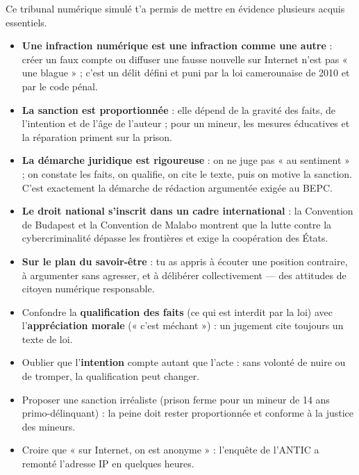 \documentclass[11pt]{article}
\newcounter{popsec}
\newcounter{popsub}
\newcommand{\courssub}[1]{%
  \stepcounter{popsub}%
  \par\vspace{9pt}\noindent{\popxbold\fontsize{11.5}{13}\selectfont\color{popink}{\color{poporange}\thepopsec.\thepopsub}\hspace{6pt}#1}\par\nopagebreak\vspace{4pt}
}
\begin{document}
\courssub{Bilan de l'activité}

Ce tribunal numérique simulé t'a permis de mettre en évidence plusieurs acquis essentiels.

\begin{itemize}
\item \textbf{Une infraction numérique est une infraction comme une autre} : créer un faux compte ou diffuser une fausse nouvelle sur Internet n'est pas « une blague » ; c'est un délit défini et puni par la loi camerounaise de 2010 et par le code pénal.
\item \textbf{La sanction est proportionnée} : elle dépend de la gravité des faits, de l'intention et de l'âge de l'auteur ; pour un mineur, les mesures éducatives et la réparation priment sur la prison.
\item \textbf{La démarche juridique est rigoureuse} : on ne juge pas « au sentiment » ; on constate les faits, on qualifie, on cite le texte, puis on motive la sanction. C'est exactement la démarche de rédaction argumentée exigée au BEPC.
\item \textbf{Le droit national s'inscrit dans un cadre international} : la Convention de Budapest et la Convention de Malabo montrent que la lutte contre la cybercriminalité dépasse les frontières et exige la coopération des États.
\item \textbf{Sur le plan du savoir-être} : tu as appris à écouter une position contraire, à argumenter sans agresser, et à délibérer collectivement — des attitudes de citoyen numérique responsable.
\end{itemize}

\begin{attention}
\begin{itemize}
\item Confondre la \textbf{qualification des faits} (ce qui est interdit par la loi) avec l'\textbf{appréciation morale} (« c'est méchant ») : un jugement cite toujours un texte de loi.
\item Oublier que l'\textbf{intention} compte autant que l'acte : sans volonté de nuire ou de tromper, la qualification peut changer.
\item Proposer une sanction irréaliste (prison ferme pour un mineur de 14 ans primo-délinquant) : la peine doit rester proportionnée et conforme à la justice des mineurs.
\item Croire que « sur Internet, on est anonyme » : l'enquête de l'ANTIC a remonté l'adresse IP en quelques heures.
\end{itemize}
\end{attention}
\end{document}
